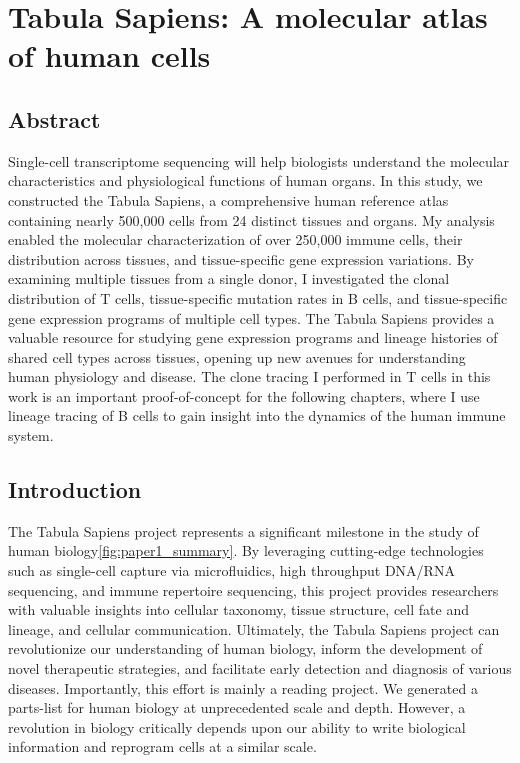 \chapter{Tabula Sapiens: A molecular atlas of human cells}

\section{Abstract}
Single-cell transcriptome sequencing will help biologists understand the molecular characteristics and physiological functions of human organs. In this study, we constructed the Tabula Sapiens, a comprehensive human reference atlas containing nearly 500,000 cells from 24 distinct tissues and organs. My analysis enabled the molecular characterization of over 250,000 immune cells, their distribution across tissues, and tissue-specific gene expression variations. By examining multiple tissues from a single donor, I investigated the clonal distribution of T cells, tissue-specific mutation rates in B cells, and tissue-specific gene expression programs of multiple cell types. The Tabula Sapiens provides a valuable resource for studying gene expression programs and lineage histories of shared cell types across tissues, opening up new avenues for understanding human physiology and disease. The clone tracing I performed in T cells in this work is an important proof-of-concept for the following chapters, where I use lineage tracing of B cells to gain insight into the dynamics of the human immune system. 

\section{Introduction}

The Tabula Sapiens project represents a significant milestone in the study of human biology\ref{fig:paper1_summary}. By leveraging cutting-edge technologies such as single-cell capture via microfluidics, high throughput DNA/RNA sequencing, and immune repertoire sequencing, this project provides researchers with valuable insights into cellular taxonomy, tissue structure, cell fate and lineage, and cellular communication. Ultimately, the Tabula Sapiens project can revolutionize our understanding of human biology, inform the development of novel therapeutic strategies, and facilitate early detection and diagnosis of various diseases. Importantly, this effort is mainly a reading project. We generated a parts-list for human biology at unprecedented scale and depth. However, a revolution in biology critically depends upon our ability to write biological information and reprogram cells at a similar scale.  

